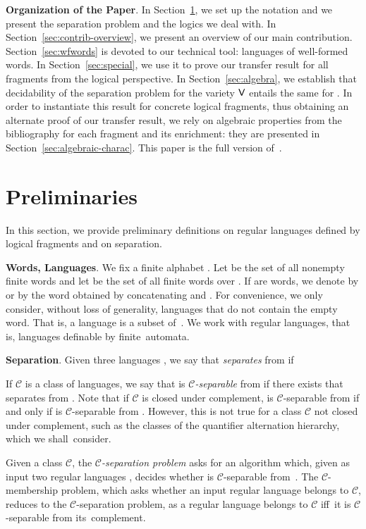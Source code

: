 \documentclass[a4paper,USenglish]{lipics}
\newcommand\Cs{\ensuremath{\mathcal{C}}\xspace}
\newcommand\Vbf{\ensuremath{{\sf V}}\xspace}
\newcommand\highlight[1]{\par\bigskip\noindent\textbf{\sffamily #1}.}
\theoremstyle{plain}
\begin{document}
\highlight{Organization of the Paper} In Section~\ref{sec:prelims}, we set up
the notation and we present the separation problem and the logics we deal
with. In Section~\ref{sec:contrib-overview}, we present an overview of our main
contribution. Section~\ref{sec:wfwords} is devoted to our technical tool:
languages of well-formed words. In Section~\ref{sec:special}, we use it to
prove our transfer result for all fragments from the logical perspective. In
Section~\ref{sec:algebra}, we establish that decidability of the separation
problem for the variety \Vbf entails the same for . In order to
instantiate this result for concrete logical fragments, thus obtaining an
alternate proof of our transfer result, we rely on algebraic properties from
the bibliography for each fragment and its enrichment: they are presented in
Section~\ref{sec:algebraic-charac}.
This paper is the full version of~\cite{PZ:plusone-stacs}.

\section{Preliminaries}
\label{sec:prelims}
In this section, we provide preliminary definitions on regular
languages defined by logical fragments and on separation.

\highlight{Words, Languages} We fix a finite alphabet . Let
 be the set of all nonempty finite words and let  be the set
of all finite words over . If  are words, we denote by  or by 
the word obtained by concatenating  and . For convenience, we
only consider, without loss of generality, languages that do not contain the empty
word. That is, a language is a subset of~. We work with regular languages,
that is, languages definable by finite~automata.

\highlight{Separation}
Given three languages , we say that  \emph{separates}
 from  if

If \Cs is a class of languages, we say that  is \emph{\Cs-separable} from
 if there exists  that separates  from . Note that if
\Cs is closed under complement,  is \Cs-separable from  if and only if  is
\Cs-separable from . However, this is not true for a class \Cs not closed
under complement, such as the classes  of the quantifier alternation
hierarchy, which we shall~consider.

Given a class \Cs, the \emph{\Cs-separation problem} asks for an algorithm
which, given as input two regular languages , decides whether  is
\Cs-separable from~. The \Cs-membership problem, which asks whether
an input regular language belongs to \Cs, reduces to the \Cs-separation
problem, as a regular language belongs to \Cs iff\ it is \Cs-separable
from its~complement.
\end{document}
